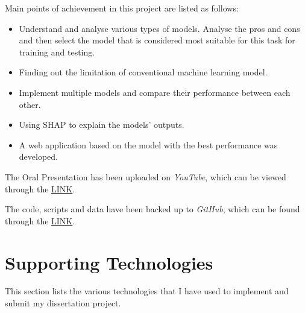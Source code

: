 \documentclass[ %
                    author={Bocheng Wang},
                supervisor={Dr. Qiang Liu},
                    degree={MSc},
                     title={A Research on Identification of Suicide Ideation in Texts with Multiple Models},
                      type={},
                      year={2024}]{dissertation}
\begin{document}
\bigskip

\noindent
Main points of achievement in this project are listed as follows:

\begin{itemize}
      \item Understand and analyse various types of models. Analyse the pros and cons and then select the model that is considered most suitable for this task for training and testing.
      \item Finding out the limitation of conventional machine learning model.
      \item Implement multiple models and compare their performance between each other.
      \item Using SHAP to explain the models' outputs.
      \item A web application based on the model with the best performance was developed.
\end{itemize}

\bigskip

The Oral Presentation has been uploaded on {\em YouTube}, which can be viewed through the \href{https://youtu.be/ZRfwWOvIWOA}{LINK}.

The code, scripts and data have been backed up to {\em GitHub}, which can be found through the \href{https://github.com/Sting-Scorpion/DataScience_Project}{LINK}.


\chapter*{Supporting Technologies}
\noindent
This section lists the various technologies that I have used to implement and submit my dissertation project.
\end{document}
